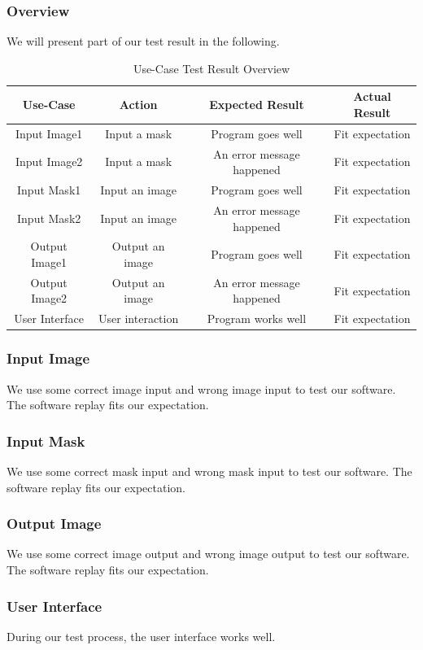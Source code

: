 \documentclass[12pt]{article}
\begin{document}
\subsubsection*{Overview}
\qquad We will present part of our test result in the following.
\begin{table}[H]
	\centering
	\begin{tabular}{|c|c|c|c|}
		\hline
		Use-Case & Action & Expected Result& Actual Result\\
		\hline
		Input Image1 & Input a mask & Program goes well& Fit expectation\\
		\hline
		Input Image2 & Input a mask & An error message happened & Fit expectation\\
		\hline
		Input Mask1 & Input an image & Program goes well& Fit expectation\\
		\hline
		Input Mask2 & Input an image & An error message happened& Fit expectation\\
		\hline
		Output Image1 & Output an image & Program goes well& Fit expectation\\
		\hline
		Output Image2 & Output an image & An error message happened& Fit expectation\\
		\hline
		User Interface & User interaction & Program works well& Fit expectation\\
		\hline
	\end{tabular}
	\caption{Use-Case Test Result Overview}
\end{table}
\subsubsection*{Input Image}
\qquad We use some correct image input and wrong image input to test our software. The software replay fits our expectation. 
\subsubsection*{Input Mask}
\qquad We use some correct mask input and wrong mask input to test our software. The software replay fits our expectation. 
\subsubsection*{Output Image}
\qquad We use some correct image output and wrong image output to test our software. The software replay fits our expectation. 
\subsubsection*{User Interface} 
\qquad During our test process, the user interface works well.
\end{document}
